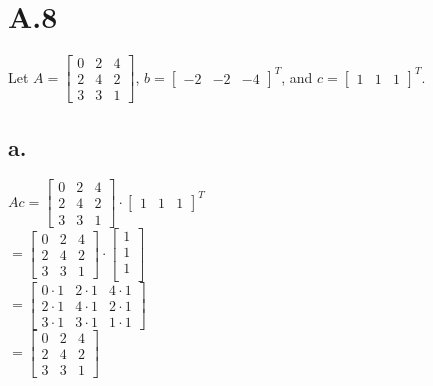 \documentclass{article}
\newcommand{\1}{\mathbf{1}}
\begin{document}
\section*{A.8}
{\Large 

Let $A = \begin{bmatrix} 0 & 2 & 4 \\ 2 & 4 & 2 \\ 3 & 3 & 1 \end{bmatrix}$, $b = \begin{bmatrix} -2 & -2 & -4 \end{bmatrix}^T$, and $c=\begin{bmatrix} 1 & 1 & 1 \end{bmatrix}^T$.

\subsection*{a.}
$Ac = \begin{bmatrix} 0 & 2 & 4 \\ 2 & 4 & 2 \\ 3 & 3 & 1 \end{bmatrix} \cdot \begin{bmatrix} 1 & 1 & 1 \end{bmatrix}^T$ \\ 
$= \begin{bmatrix} 0 & 2 & 4 \\ 2 & 4 & 2 \\ 3 & 3 & 1 \end{bmatrix} \cdot \begin{bmatrix} 1 \\ 1 \\ 1 \\ \end{bmatrix}$ \\
$= \begin{bmatrix} 0 \cdot 1 & 2 \cdot 1 & 4 \cdot 1 \\ 2 \cdot 1 & 4 \cdot 1 & 2 \cdot 1 \\ 3 \cdot 1 & 3 \cdot 1 & 1 \cdot 1 \end{bmatrix}$ \\
$= \begin{bmatrix} 0 & 2 & 4 \\ 2 & 4 & 2 \\ 3 & 3 & 1 \end{bmatrix}$

}
\end{document}
